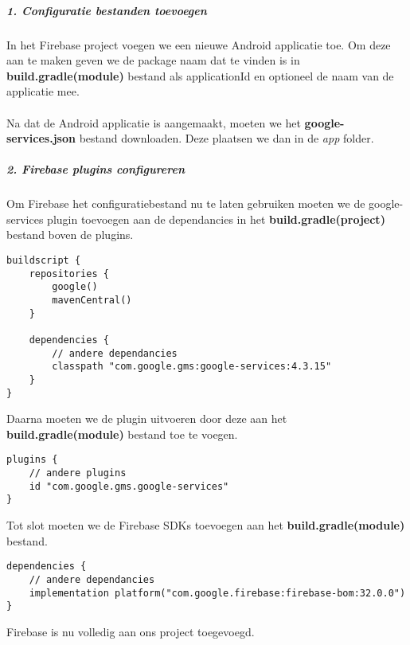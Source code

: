 \subparagraph{1. Configuratie bestanden toevoegen}
In het Firebase project voegen we een nieuwe Android applicatie toe. Om deze aan te maken geven we de package naam 
dat te vinden is in \textbf{build.gradle(module)} bestand als applicationId en optioneel de naam van de applicatie mee.
\\\\
Na dat de Android applicatie is aangemaakt, moeten we het \textbf{google-services.json} bestand downloaden. 
Deze plaatsen we dan in de \textit{app} folder.

\subparagraph{2. Firebase plugins configureren}
Om Firebase het configuratiebestand nu te laten gebruiken moeten we de google-services plugin toevoegen aan 
de dependancies in het \textbf{build.gradle(project)} bestand boven de plugins. 
\begin{verbatim}
buildscript {
    repositories {
        google()
        mavenCentral()
    }

    dependencies {
        // andere dependancies
        classpath "com.google.gms:google-services:4.3.15"
    }
}
\end{verbatim}
Daarna moeten we de plugin uitvoeren door deze aan het \textbf{build.gradle(module)} bestand toe te voegen.
\begin{verbatim}
plugins {
    // andere plugins 
    id "com.google.gms.google-services"
}
\end{verbatim}
Tot slot moeten we de Firebase SDKs toevoegen aan het \textbf{build.gradle(module)} bestand.
\begin{verbatim}
dependencies {
    // andere dependancies
    implementation platform("com.google.firebase:firebase-bom:32.0.0")
}
\end{verbatim}
Firebase is nu volledig aan ons project toegevoegd.